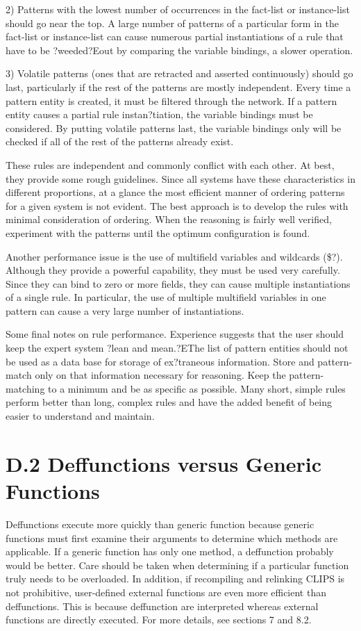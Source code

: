 \documentclass[letterpaper,10pt,english]{sphinxmanual}
\begin{document}
2) Patterns with the lowest number of occurrences in the fact-list or
instance-list should go near the top. A large number of patterns of a
particular form in the fact-list or instance-list can cause numerous
partial instantiations of a rule that have to be ?weeded?Eout by
comparing the variable bindings, a slower operation.

3) Volatile patterns (ones that are retracted and asserted continuously)
should go last, particularly if the rest of the patterns are mostly
independent. Every time a pattern entity is created, it must be filtered
through the network. If a pattern entity causes a partial rule
instan?tiation, the variable bindings must be considered. By putting
volatile patterns last, the variable bindings only will be checked if
all of the rest of the patterns already exist.

These rules are  independent and commonly conflict with each other.
At best, they provide some rough guidelines. Since all systems have
these characteristics in different proportions, at a glance the most
efficient manner of ordering patterns for a given system is not evident.
The best approach is to develop the rules with minimal consideration of
ordering. When the reasoning is fairly well verified, experiment with
the patterns until the optimum configuration is found.

Another performance issue is the use of multifield variables and
wildcards (\$?). Although they provide a powerful capability, they must
be used very carefully. Since they can bind to zero or more fields, they
can cause multiple instantiations of a single rule. In particular, the
use of multiple multifield variables in one pattern can cause a very
large number of instantiations.

Some final notes on rule performance. Experience suggests that the user
should keep the expert system ?lean and mean.?EThe list of pattern
entities should not be used as a data base for storage of ex?traneous
information. Store and pattern-match only on that information necessary
for reasoning. Keep the pattern-matching to a minimum and be as specific
as possible. Many short, simple rules perform better than long, complex
rules and have the added benefit of being easier to understand and
maintain.


\section{D.2 Deffunctions versus Generic Functions}
\label{\detokenize{appendix:d-2-deffunctions-versus-generic-functions}}
Deffunctions execute more quickly than generic function because generic
functions must first examine their arguments to determine which methods
are applicable. If a generic function has only one method, a deffunction
probably would be better. Care should be taken when determining if a
particular function truly needs to be overloaded. In addition, if
recompiling and relinking CLIPS is not prohibitive, user-defined
external functions are even more efficient than deffunctions. This is
because deffunction are interpreted whereas external functions are
directly executed. For more details, see sections 7 and 8.2.
\end{document}
